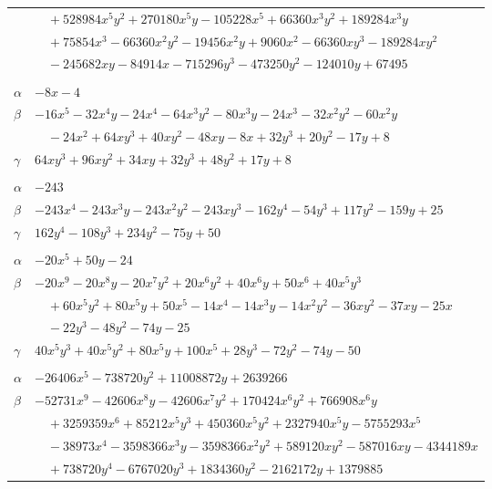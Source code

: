 \documentclass[11pt]{article}
\begin{document}
\begin{longtable}{@{}ll@{}}
 & $\quad +528984x^{5}y^{2}+270180x^{5}y-105228x^{5}+66360x^{3}y^{2}+189284x^{3}y$\\
 & $\quad +75854x^{3}-66360x^{2}y^{2}-19456x^{2}y+9060x^{2}-66360xy^{3}-189284xy^{2}$\\
 & $\quad -245682xy-84914x-715296y^{3}-473250y^{2}-124010y+67495$\\
\addlinespace[3pt]
\multicolumn{2}{@{}l}{$\{i,j\}=\{7,39\}$, $k_{ij}=2^{2}\cdot 5$}\\
$\alpha$ & $-8x-4$\\
$\beta$ & $-16x^{5}-32x^{4}y-24x^{4}-64x^{3}y^{2}-80x^{3}y-24x^{3}-32x^{2}y^{2}-60x^{2}y$\\
 & $\quad -24x^{2}+64xy^{3}+40xy^{2}-48xy-8x+32y^{3}+20y^{2}-17y+8$\\
$\gamma$ & $64xy^{3}+96xy^{2}+34xy+32y^{3}+48y^{2}+17y+8$\\
\addlinespace[3pt]
\multicolumn{2}{@{}l}{$\{i,j\}=\{8,11\}$, $k_{ij}=7^{3}$}\\
$\alpha$ & $-243$\\
$\beta$ & $-243x^{4}-243x^{3}y-243x^{2}y^{2}-243xy^{3}-162y^{4}-54y^{3}+117y^{2}-159y+25$\\
$\gamma$ & $162y^{4}-108y^{3}+234y^{2}-75y+50$\\
\addlinespace[3pt]
\multicolumn{2}{@{}l}{$\{i,j\}=\{8,16\}$, $k_{ij}=2^{3}\cdot 3$}\\
$\alpha$ & $-20x^{5}+50y-24$\\
$\beta$ & $-20x^{9}-20x^{8}y-20x^{7}y^{2}+20x^{6}y^{2}+40x^{6}y+50x^{6}+40x^{5}y^{3}$\\
 & $\quad +60x^{5}y^{2}+80x^{5}y+50x^{5}-14x^{4}-14x^{3}y-14x^{2}y^{2}-36xy^{2}-37xy-25x$\\
 & $\quad -22y^{3}-48y^{2}-74y-25$\\
$\gamma$ & $40x^{5}y^{3}+40x^{5}y^{2}+80x^{5}y+100x^{5}+28y^{3}-72y^{2}-74y-50$\\
\addlinespace[3pt]
\multicolumn{2}{@{}l}{$\{i,j\}=\{8,24\}$, $k_{ij}=2^{6}\cdot 11$}\\
$\alpha$ & $-26406x^{5}-738720y^{2}+11008872y+2639266$\\
$\beta$ & $-52731x^{9}-42606x^{8}y-42606x^{7}y^{2}+170424x^{6}y^{2}+766908x^{6}y$\\
 & $\quad +3259359x^{6}+85212x^{5}y^{3}+450360x^{5}y^{2}+2327940x^{5}y-5755293x^{5}$\\
 & $\quad -38973x^{4}-3598366x^{3}y-3598366x^{2}y^{2}+589120xy^{2}-587016xy-4344189x$\\
 & $\quad +738720y^{4}-6767020y^{3}+1834360y^{2}-2162172y+1379885$\\

\end{longtable}
\end{document}
